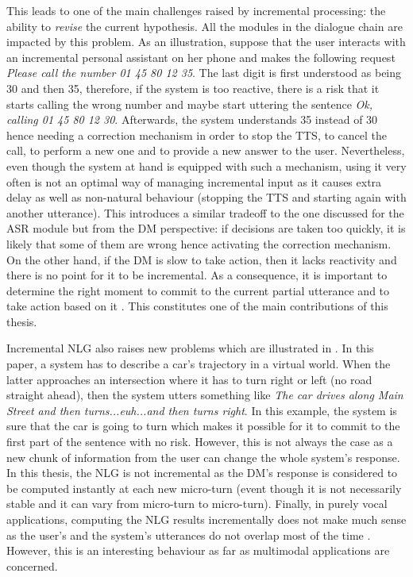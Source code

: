 This leads to one of the main challenges raised by incremental processing: the ability to \textit{revise} the current hypothesis. All the modules in the dialogue chain are impacted by this problem. As an illustration, suppose that the user interacts with an incremental personal assistant on her phone and makes the following request \textit{Please call the number 01 45 80 12 35}. The last digit is first understood as being 30 and then 35, therefore, if the system is too reactive, there is a risk that it starts calling the wrong number and maybe start uttering the sentence \textit{Ok, calling 01 45 80 12 30}. Afterwards, the system understands 35 instead of 30 hence needing a correction mechanism in order to stop the TTS, to cancel the call, to perform a new one and to provide a new answer to the user. Nevertheless, even though the system at hand is equipped with such a mechanism, using it very often is not an optimal way of managing incremental input as it causes extra delay as well as non-natural behaviour (stopping the TTS and starting again with another utterance). This introduces a similar tradeoff to the one discussed for the ASR module but from the DM perspective: if decisions are taken too quickly, it is likely that some of them are wrong hence activating the correction mechanism. On the other hand, if the DM is slow to take action, then it lacks reactivity and there is no point for it to be incremental. As a consequence, it is important to determine the right moment to commit to the current partial utterance and to take action based on it \cite{Raux2008,Lu2011}. This constitutes one of the main contributions of this thesis.

		Incremental NLG also raises new problems which are illustrated in \cite{Baumann2013}. In this paper, a system has to describe a car's trajectory in a virtual world. When the latter approaches an intersection where it has to turn right or left (no road straight ahead), then the system utters something like \textit{The car drives along Main Street and then turns...euh...and then turns right}. In this example, the system is sure that the car is going to turn which makes it possible for it to commit to the first part of the sentence with no risk. However, this is not always the case as a new chunk of information from the user can change the whole system's response. In this thesis, the NLG is not incremental as the DM's response is considered to be computed instantly at each new micro-turn (event though it is not necessarily stable and it can vary from micro-turn to micro-turn). Finally, in purely vocal applications, computing the NLG results incrementally does not make much sense as the user's and the system's utterances do not overlap most of the time \cite{Sacks1974}. However, this is an interesting behaviour as far as multimodal applications are concerned.

